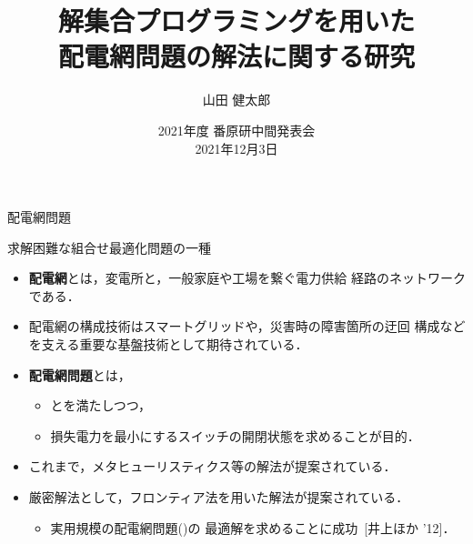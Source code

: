 \documentclass[dvipdfmx,11pt]{beamer}
\title{解集合プログラミングを用いた\\配電網問題の解法に関する研究}
\author[山田 健太郎]{山田 健太郎}
\date{2021\!\:年度 番原研中間発表会 \\2021年12月3日}
\institute{番原研究室}
\begin{document}
\begin{frame}{}
  \titlepage
\end{frame}

\begin{frame}{配電網問題}
  \begin{alertblock}{}\centering
    求解困難な組合せ最適化問題の一種
  \end{alertblock}
  \vfill
  \begin{itemize}
  \item \alert{\bf 配電網}とは，変電所と，一般家庭や工場を繋ぐ電力供給
    経路のネットワークである．
  \item  配電網の構成技術はスマートグリッドや，災害時の障害箇所の迂回
    構成などを支える重要な基盤技術として期待されている．
  \item \alert{\bf 配電網問題}とは，
    \begin{itemize}
    \item {}とを満たしつつ，
    \item 損失電力を最小にするスイッチの開閉状態を求めることが目的．
    \end{itemize}
  \item これまで，メタヒューリスティクス等の解法が提案されている．
  \item 厳密解法として，フロンティア法を用いた解法が提案されている．
    \begin{itemize}
    \item 実用規模の配電網問題()の
      最適解を求めることに成功~[井上ほか '12]．
    \end{itemize}
  \end{itemize}
\end{frame}
\end{document}
